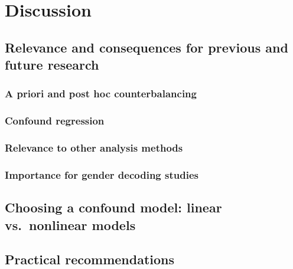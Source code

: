 \documentclass[12pt,american,a4paper,oneside,]{memoir} %
\begin{document}
\hypertarget{confounds-decoding-discussion}{%
\section{Discussion}\label{confounds-decoding-discussion}}

\hypertarget{relevance-and-consequences-for-previous-and-future-research}{%
\subsection{Relevance and consequences for previous and future research}\label{relevance-and-consequences-for-previous-and-future-research}}

\hypertarget{a-priori-and-post-hoc-counterbalancing}{%
\subsubsection{A priori and post hoc counterbalancing}\label{a-priori-and-post-hoc-counterbalancing}}

\hypertarget{confound-regression-1}{%
\subsubsection{Confound regression}\label{confound-regression-1}}

\hypertarget{relevance-to-other-analysis-methods}{%
\subsubsection{Relevance to other analysis methods}\label{relevance-to-other-analysis-methods}}

\hypertarget{importance-for-gender-decoding-studies}{%
\subsubsection{Importance for gender decoding studies}\label{importance-for-gender-decoding-studies}}

\hypertarget{choosing-a-confound-model-linear-vs.-nonlinear-models}{%
\subsection{Choosing a confound model: linear vs.~nonlinear models}\label{choosing-a-confound-model-linear-vs.-nonlinear-models}}

\hypertarget{practical-recommendations}{%
\subsection{Practical recommendations}\label{practical-recommendations}}
\end{document}
